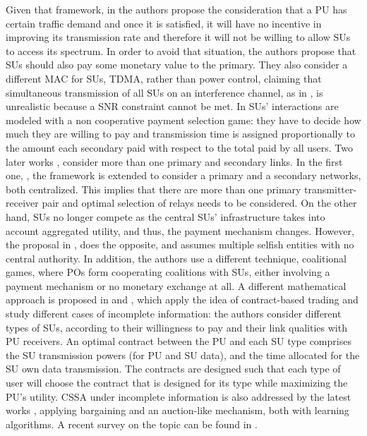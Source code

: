 Given that framework, in \cite{ref:Zhang2009} the authors propose the consideration that a PU has certain traffic demand and once it is satisfied, it will have no incentive in improving its transmission rate and therefore it will not be willing to allow SUs to access its spectrum. In order to avoid that situation, the authors propose that SUs should also pay some monetary value to the primary. They also consider a different MAC for SUs, TDMA, rather than power control, claiming that simultaneous transmission of all SUs on an interference channel, as in \cite{ref:Simeone2008}, is unrealistic because a SNR constraint cannot be met. In \cite{ref:Zhang2009}  SUs' interactions are modeled with a non cooperative payment selection game: they have to decide how much they are willing to pay and transmission time is assigned proportionally to the amount each secondary paid with respect to the total paid by all users. Two later works \cite{ref:Yi2010,ref:Li2011}, consider more than one primary and secondary links. 
In the first one, \cite{ref:Yi2010}, the framework is extended to consider a primary and a secondary networks, both centralized. This implies that there are more than one primary transmitter-receiver pair and optimal selection of relays needs to be considered. On the other hand, SUs no longer compete as the central SUs' infrastructure takes into account aggregated utility, and thus, the payment mechanism changes. 
However, the proposal in \cite{ref:Li2011}, does the opposite, and assumes multiple selfish entities with no central authority. In addition, the authors use a different technique, coalitional games, where POs form cooperating coalitions with SUs, either involving a payment mechanism or no monetary exchange at all. A different mathematical approach is proposed in \cite{ref:Duan2011_Contract} and \cite{ref:Duan2014}, which apply the idea of contract-based trading and study different cases of incomplete information: the authors consider different types of SUs, according to their willingness to pay and their link qualities with PU receivers. An optimal contract between the PU and each SU type comprises the SU transmission powers (for PU and SU data), and the time allocated for the SU own data transmission. The contracts are designed such that each type of user will choose the contract that is designed for its type while maximizing the PU's utility. CSSA under incomplete information is also addressed by the latest works \cite{ref:Yan2013,ref:Feng2014}, applying bargaining and an auction-like mechanism, both with learning algorithms. A recent survey on the topic can be found in \cite{ref:Huang2013}.

